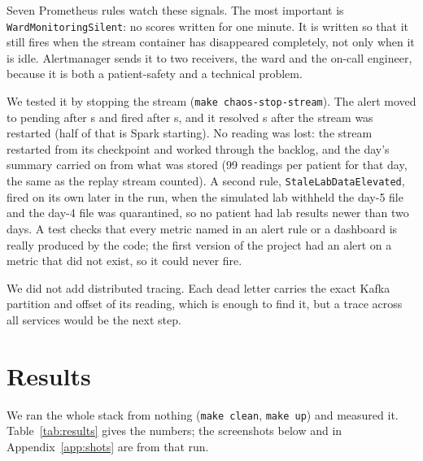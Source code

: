 \documentclass[11pt,a4paper]{article}
\begin{document}
Seven Prometheus rules watch these signals. The most important is
\texttt{WardMonitoringSilent}: no scores written for one minute. It is written so that
it still fires when the stream container has disappeared completely, not only when it is
idle. Alertmanager sends it to two receivers, the ward and the on-call engineer, because
it is both a patient-safety and a technical problem.

We tested it by stopping the stream (\texttt{make chaos-stop-stream}). The alert moved
to pending after \mSilentPending{} s and fired after \mSilentFiring{} s, and it resolved
\mSilentResolved{} s after the stream was restarted (half of that is Spark starting).
No reading was lost: the stream restarted from its checkpoint and worked through the
backlog, and the day's summary carried on from what was stored (99 readings per patient
for that day, the same as the replay stream counted). A second rule, \texttt{StaleLabDataElevated}, fired on its own later in the run,
when the simulated lab withheld the day-5 file and the day-4 file was quarantined, so no
patient had lab results newer than two days. A test checks that every metric
named in an alert rule or a dashboard is really produced by the code; the first version
of the project had an alert on a metric that did not exist, so it could never fire.

We did not add distributed tracing. Each dead letter carries the exact Kafka partition
and offset of its reading, which is enough to find it, but a trace across all services
would be the next step.

\section{Results}

We ran the whole stack from nothing (\texttt{make clean}, \texttt{make up}) and measured
it. Table~\ref{tab:results} gives the numbers; the screenshots below and in
Appendix~\ref{app:shots} are from that run.
\end{document}
